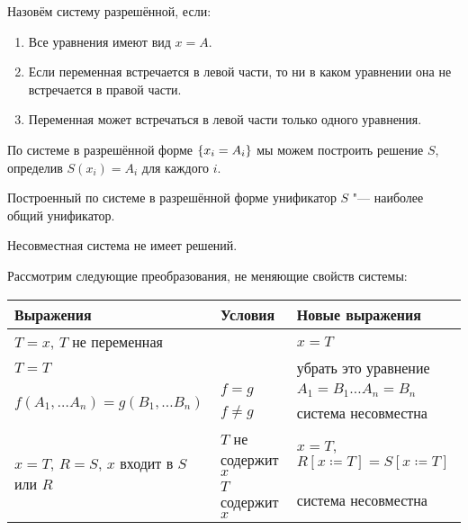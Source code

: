 \begin{definition}
    Назовём систему разрешённой, если:
    \begin{enumerate}
        \item Все уравнения имеют вид $x = A$.
        \item Если переменная встречается в левой части, то ни в каком уравнении она не встречается в правой части.
        \item Переменная может встречаться в левой части только одного уравнения.
    \end{enumerate}
\end{definition}

По системе в разрешённой форме $\left\{x_i = A_i\right\}$ мы можем построить решение $S$, определив $S(x_i) = A_i$ для каждого $i$.

\begin{statement}
    Построенный по системе в разрешённой форме унификатор $S$ "--- наиболее общий унификатор.
\end{statement}

\begin{statement}
    Несовместная система не имеет решений.
\end{statement}

Рассмотрим следующие преобразования, не меняющие свойств системы:
\begin{center}
\begin{tabular}{l l l} \toprule
    Выражения                         & Условия             & Новые выражения \\ \midrule
    $T=x$, $T$ не переменная          &                     & $x=T$ \\ \midrule
    $T=T$                             &                     & убрать это уравнение \\ \midrule
    \multirow{2}{*}[-\aboverulesep]{$f(A_1, \ldots A_n) = g(B_1, \ldots B_n)$}
                                      & $f=g$               & $ A_1 = B_1 \ldots A_n = B_n$ \\ \cmidrule{2-3}
                                      & $f \neq g$          & система несовместна \\ \midrule
    \multirow{2}{*}[-\aboverulesep]{$x=T$, $R=S$, $x$ входит в $S$ или $R$}
                                      & $T$ не содержит $x$ & $x=T$,
                                        $R\left[x\coloneqq T\right]=S\left[x\coloneqq T\right]$\\ \cmidrule{2-3}
                                      & $T$ содержит $x$    & система несовместна \\ \bottomrule
\end{tabular}
\end{center}

